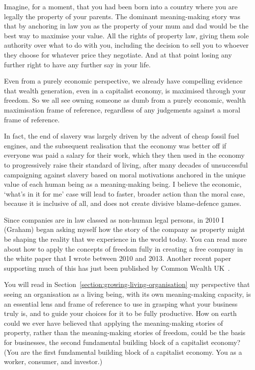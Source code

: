 Imagine, for a moment, that you had been born into a country where you are legally the property of your parents. The dominant meaning\hyp{}making story was that by anchoring in law you as the property of your mum and dad would be the best way to maximise your value. All the rights of property law, giving them sole authority over what to do with you, including the decision to sell you to whoever they choose for whatever price they negotiate. And at that point losing any further right to have any further say in your life. 


Even from a purely economic perspective, we already have compelling evidence that wealth generation, even in a capitalist economy, is maximised through your freedom. So we all see owning someone as dumb from a purely economic, wealth maximisation frame of reference, regardless of any judgements against a moral frame of reference. 


In fact, the end of slavery was largely driven by the advent of cheap fossil fuel engines, and the subsequent realisation that the economy was better off if everyone was paid a salary for their work, which they then used in the economy to progressively raise their standard of living, after many decades of unsuccessful campaigning against slavery based on moral motivations anchored in the unique value of each human being as a meaning\hyp{}making being. I believe the economic, ‘what’s in it for me’ case will lead to faster, broader action than the moral case, because it is inclusive of all, and does not create divisive blame-defence games.


Since companies are in law classed as non-human legal persons, in 2010 I (Graham) began asking myself how the story of the company as property might be shaping the reality that we experience in the world today. You can read more about how to apply the concepts of freedom fully in creating a free company in the white paper that I wrote between 2010 and 2013\cite{boyd-msc-msv}. Another recent paper supporting much of this has just been published by Common Wealth UK~\cite{lawrence-commoning-the-company, deakin-corporation-as-commons}.


You will read in Section~\ref{section:growing-living-organisation} my perspective that seeing an organisation as a living being, with its own meaning\hyp{}making capacity, is an essential lens and frame of reference to use in grasping what your business truly is, and to guide your choices for it to be fully productive. How on earth could we ever have believed that applying the meaning\hyp{}making stories of property, rather than the meaning\hyp{}making stories of freedom, could be the basis for businesses, the second fundamental building block of a capitalist economy? (You are the first fundamental building block of a capitalist economy. You as a worker, consumer, and investor.)


